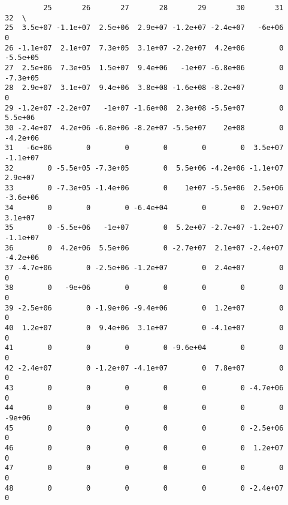 \documentclass{article}
\begin{document}
    
    \begin{verbatim}
         25       26       27       28       29       30       31       32  \
25  3.5e+07 -1.1e+07  2.5e+06  2.9e+07 -1.2e+07 -2.4e+07   -6e+06        0   
26 -1.1e+07  2.1e+07  7.3e+05  3.1e+07 -2.2e+07  4.2e+06        0 -5.5e+05   
27  2.5e+06  7.3e+05  1.5e+07  9.4e+06   -1e+07 -6.8e+06        0 -7.3e+05   
28  2.9e+07  3.1e+07  9.4e+06  3.8e+08 -1.6e+08 -8.2e+07        0        0   
29 -1.2e+07 -2.2e+07   -1e+07 -1.6e+08  2.3e+08 -5.5e+07        0  5.5e+06   
30 -2.4e+07  4.2e+06 -6.8e+06 -8.2e+07 -5.5e+07    2e+08        0 -4.2e+06   
31   -6e+06        0        0        0        0        0  3.5e+07 -1.1e+07   
32        0 -5.5e+05 -7.3e+05        0  5.5e+06 -4.2e+06 -1.1e+07  2.9e+07   
33        0 -7.3e+05 -1.4e+06        0    1e+07 -5.5e+06  2.5e+06 -3.6e+06   
34        0        0        0 -6.4e+04        0        0  2.9e+07  3.1e+07   
35        0 -5.5e+06   -1e+07        0  5.2e+07 -2.7e+07 -1.2e+07 -1.1e+07   
36        0  4.2e+06  5.5e+06        0 -2.7e+07  2.1e+07 -2.4e+07 -4.2e+06   
37 -4.7e+06        0 -2.5e+06 -1.2e+07        0  2.4e+07        0        0   
38        0   -9e+06        0        0        0        0        0        0   
39 -2.5e+06        0 -1.9e+06 -9.4e+06        0  1.2e+07        0        0   
40  1.2e+07        0  9.4e+06  3.1e+07        0 -4.1e+07        0        0   
41        0        0        0        0 -9.6e+04        0        0        0   
42 -2.4e+07        0 -1.2e+07 -4.1e+07        0  7.8e+07        0        0   
43        0        0        0        0        0        0 -4.7e+06        0   
44        0        0        0        0        0        0        0   -9e+06   
45        0        0        0        0        0        0 -2.5e+06        0   
46        0        0        0        0        0        0  1.2e+07        0   
47        0        0        0        0        0        0        0        0   
48        0        0        0        0        0        0 -2.4e+07        0   


\end{verbatim}
\end{document}
